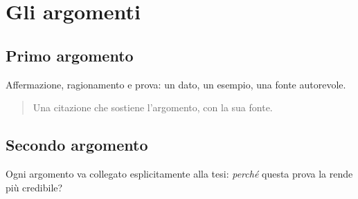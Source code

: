 \chapter{Gli argomenti}

\section{Primo argomento}
Affermazione, ragionamento e prova: un dato, un esempio, una fonte
autorevole.

\begin{quote}
Una citazione che sostiene l'argomento, con la sua fonte.
\end{quote}

\section{Secondo argomento}
Ogni argomento va collegato esplicitamente alla tesi: \emph{perché} questa
prova la rende più credibile?

